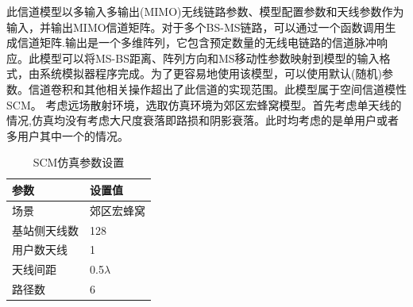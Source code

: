 \documentclass[bachelor,nocolorlinks, printoneside]{seuthesis} %
\begin{document}
\begin{Main}
此信道模型以多输入多输出(MIMO)无线链路参数、模型配置参数和天线参数作为输入，并输出MIMO信道矩阵。对于多个BS-MS链路，可以通过一个函数调用生成信道矩阵.输出是一个多维阵列，它包含预定数量的无线电链路的信道脉冲响应。此模型可以将MS-BS距离、阵列方向和MS移动性参数映射到模型的输入格式，由系统模拟器程序完成。为了更容易地使用该模型，可以使用默认(随机)参数。信道卷积和其他相关操作超出了此信道的实现范围。此模型属于空间信道模性SCM。
考虑远场散射环境，选取仿真环境为郊区宏蜂窝模型。首先考虑单天线的情况,仿真均没有考虑大尺度衰落即路损和阴影衰落。此时均考虑的是单用户或者多用户其中一个的情况。
\begin{table}[htbp]
	\centering
	\caption{\label{tab:test}SCM仿真参数设置}
	\begin{tabular}{ll}
		\toprule
		参数 &  设置值 \\
				\bottomrule
		场景 &  郊区宏蜂窝 \\
				\bottomrule
		基站侧天线数 & 128 \\
				\bottomrule
		用户数天线	& 1 \\
				\bottomrule
		天线间距 & 0.5$\lambda$ \\
				\bottomrule
		路径数 & 6 \\
		\bottomrule
	\end{tabular}
\end{table}
	

\end{Main}
\end{document}
